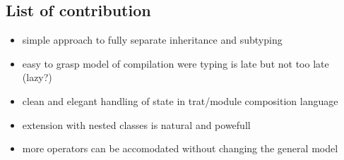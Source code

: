 \subsection{List of contribution}
\begin{itemize}
\item simple approach to fully separate inheritance and subtyping
\item easy to grasp model of compilation were typing is late but not
  too late (lazy?)
\item clean and elegant handling of state in trat/module composition language
\item extension with nested classes is natural and
  powefull
\item more operators can be accomodated without changing the general model
\end{itemize}






